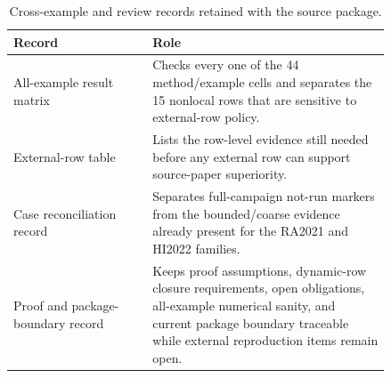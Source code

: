 \documentclass[preprint,12pt]{elsarticle}
\begin{document}
\begin{table}[htbp]
\centering
\caption{Cross-example and review records retained with the source package.}
\label{tab:all-example-review-artifacts}
\begin{tabular}{P{0.31\linewidth}P{0.53\linewidth}}
\toprule
Record & Role \\
\midrule
All-example result matrix & Checks every one of the 44 method/example cells
and separates the 15 nonlocal rows that are sensitive to external-row
policy. \\
External-row table & Lists the row-level evidence still needed before any
external row can support source-paper superiority. \\
Case reconciliation record & Separates full-campaign not-run markers from the
bounded/coarse evidence already present for the RA2021 and HI2022 families. \\
Proof and package-boundary record & Keeps proof assumptions, dynamic-row closure
requirements, open obligations, all-example numerical sanity, and current
package boundary traceable while external reproduction items remain open. \\
\bottomrule
\end{tabular}
\end{table}
\end{document}
